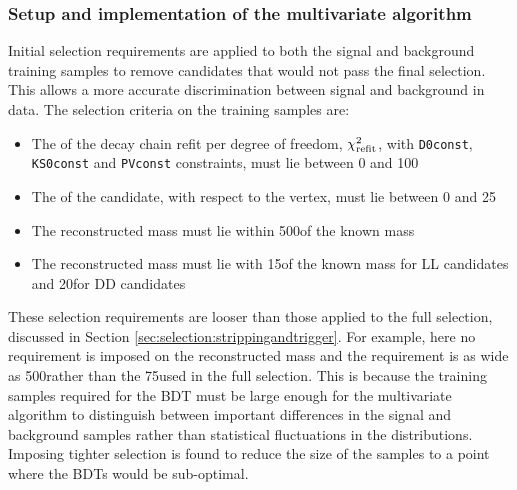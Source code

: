 \subsubsection{Setup and implementation of the multivariate algorithm}

Initial selection requirements are applied to both the signal and background training samples to remove candidates that would not pass the final selection. This allows a more accurate discrimination between signal and background in data. The selection criteria on the training samples are:

\begin{itemize}
\item The \chisq of the decay chain refit per degree of freedom, $\chi^2_\text{refit}$, with {\tt D0const}, {\tt KS0const} and {\tt PVconst} constraints, must lie between 0 and 100
\item The \chisqip of the \Bm candidate, with respect to the \Bm vertex, must lie between 0 and 25
\item The reconstructed \Kstarm mass must lie within 500\mevcc of the known \Kstarm mass
\item The reconstructed \KS mass must lie with 15\mevcc of the known \KS mass for LL candidates and 20\mevcc for DD candidates
\end{itemize}
These selection requirements are looser than those applied to the full selection, discussed in Section \ref{sec:selection:strippingandtrigger}. For example, here no requirement is imposed on the reconstructed \Dz mass and the \Kstarm requirement is as wide as 500\mevcc rather than the 75\mevcc used in the full selection. This is because the training samples required for the BDT must be large enough for the multivariate algorithm to distinguish between important differences in the signal and background samples rather than statistical fluctuations in the distributions. Imposing tighter selection is found to reduce the size of the samples to a point where the BDTs would be sub-optimal.


